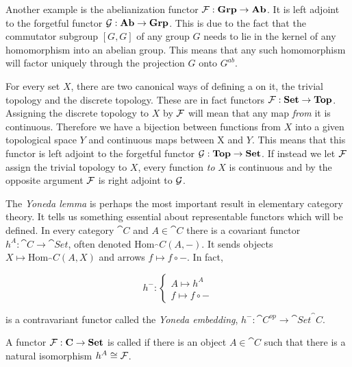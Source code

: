 \documentclass[../../main.tex]{subfiles}
\begin{document}
    Another example is the abelianization functor $\mathcal{F}: \mathbf{Grp} \to \mathbf{Ab}$. It is left adjoint to the forgetful functor $\mathcal{G}: \mathbf{Ab} \to \mathbf{Grp}$. This is due to the fact that the commutator subgroup $[G, G]$ of any group $G$ needs to lie in the kernel of any homomorphism into an abelian group. This means that any such homomorphism will factor uniquely through the projection $G$ onto $G^{ab}$.
    
    For every set $X$, there are two canonical ways of defining a on it, the trivial topology and the discrete topology. These are in fact functors $\mathcal{F}: \mathbf{Set} \to \mathbf{Top}$. Assigning the discrete topology to $X$ by $\mathcal{F}$ will mean that any map \emph{from} it is continuous. Therefore we have a bijection between functions from $X$ into a given topological space $Y$ and continuous maps between X and $Y$. This means that this functor is left adjoint to the forgetful functor $\mathcal{G}: \mathbf{Top} \to \mathbf{Set}$. If instead we let $\mathcal{F}$ assign the trivial topology to $X$, every function \emph{to} $X$ is continuous and by the opposite argument $\mathcal{F}$ is right adjoint to $\mathcal{G}$.
    
    The \emph{Yoneda lemma} is perhaps the most important result in elementary category theory. It tells us something essential about representable functors which will be defined. In every category $\cat{C}$ and $A \in \cat{C}$ there is a covariant functor $h^A: \cat{C} \to \cat{Set}$, often denoted $\mathrm{Hom}_\cat{C}(A, -)$. It sends objects $X \mapsto \mathrm{Hom}_\cat{C}(A, X)$ and arrows $f \mapsto f \circ -$. In fact, 
    
    \begin{equation*}
        h^-: 
        \begin{cases}
            A \mapsto h^A \\
            f \mapsto f \circ -
        \end{cases}
    \end{equation*}
    
    is a contravariant functor called the \emph{Yoneda embedding}, $h^-: \cat{C}^{op} \to \cat{Set}^\cat{C}$.
    
    \begin{definition}
        A functor $\mathcal{F}: \mathbf{C} \to \mathbf{Set}$ is called  if there is an object $A \in \cat{C}$ such that there is a natural isomorphism $h^A \cong \mathcal{F}$.
    \end{definition}
    
\end{document}
